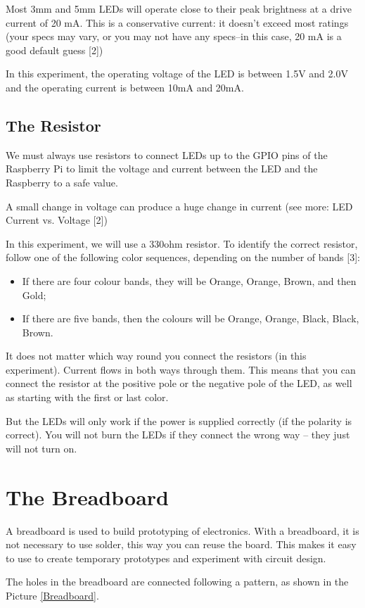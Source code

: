 \documentclass[10pt,twoside,english]{_support/latex/sbabook/sbabook}
\begin{document}
Most 3mm and 5mm LEDs will operate close to their peak brightness at a drive current of 20 mA. This is a conservative current: it doesn’t exceed most ratings (your specs may vary, or you may not have any specs–in this case, 20 mA is a good default guess {[}2{]})

In this experiment, the operating voltage of the LED is between 1.5V and 2.0V and the operating current is between 10mA and 20mA.
\subsection{The Resistor}
We must always use resistors to connect LEDs up to the GPIO pins of the Raspberry Pi to limit the voltage and current between the LED and the Raspberry to a safe value.

A small change in voltage can produce a huge change in current (see more: LED Current vs. Voltage {[}2{]})

In this experiment, we will use a 330ohm resistor. To identify the correct resistor, follow one of the following color sequences, depending on the number of bands {[}3{]}:

\begin{itemize}
\item If there are four colour bands, they will be Orange, Orange, Brown, and then Gold;
\item If there are five bands, then the colours will be Orange, Orange, Black, Black, Brown.
\end{itemize}

It does not matter which way round you connect the resistors (in this experiment). Current flows in both ways through them. This means that you can connect the resistor at the positive pole or the negative pole of the LED, as well as starting with the first or last color.

But the LEDs will only work if the power is supplied correctly (if the polarity is correct). You will not burn the LEDs if they connect the wrong way – they just will not turn on.
\section{The Breadboard}
A breadboard is used to build prototyping of electronics. With a breadboard, it is not necessary to use solder, this way you can reuse the board. This makes it easy to use to create temporary prototypes and experiment with circuit design.

The holes in the breadboard are connected following a pattern, as shown in the Picture \ref{Breadboard}.
\end{document}
